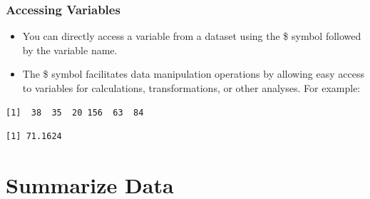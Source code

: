 \documentclass[
  letterpaper,
  DIV=11,
  numbers=noendperiod]{scrreprt}
\newenvironment{Shaded}{\begin{snugshade}}{\end{snugshade}}
\newcommand{\CommentTok}[1]{\textcolor[rgb]{0.37,0.37,0.37}{#1}}
\newcommand{\FunctionTok}[1]{\textcolor[rgb]{0.28,0.35,0.67}{#1}}
\newcommand{\NormalTok}[1]{\textcolor[rgb]{0.00,0.23,0.31}{#1}}
\newcommand{\SpecialCharTok}[1]{\textcolor[rgb]{0.37,0.37,0.37}{#1}}
\providecommand{\tightlist}{%
  \setlength{\itemsep}{0pt}\setlength{\parskip}{0pt}}\usepackage{longtable,booktabs,array}
\begin{document}
\subsection{Accessing Variables}\label{accessing-variables}

\begin{itemize}
\tightlist
\item
  You can directly access a variable from a dataset using the \$ symbol
  followed by the variable name.
\item
  The \$ symbol facilitates data manipulation operations by allowing
  easy access to variables for calculations, transformations, or other
  analyses. For example:
\end{itemize}

\begin{Shaded}
\end{Shaded}

\begin{verbatim}
[1]  38  35  20 156  63  84
\end{verbatim}

\begin{Shaded}
\end{Shaded}

\begin{verbatim}
[1] 71.1624
\end{verbatim}


\chapter{Summarize Data}\label{summarize-data}
\end{document}
